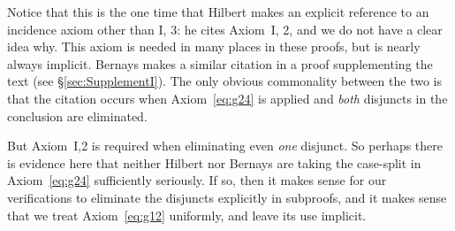 Notice that this is the one time that Hilbert makes an explicit reference to an incidence axiom other than I, 3: he cites Axiom~I, 2, and we do not have a clear idea why. This axiom is needed in many places in these proofs, but is nearly always implicit. Bernays makes a similar citation in a proof supplementing the text (see \S\ref{sec:SupplementI}). The only obvious commonality between the two is that the citation occurs when Axiom~\ref{eq:g24} is applied and \emph{both} disjuncts in the conclusion are eliminated. 

But Axiom~I,2 is required when eliminating even \emph{one} disjunct. So perhaps there is evidence here that neither Hilbert nor Bernays are taking the case-split in Axiom~\ref{eq:g24} sufficiently seriously. If so, then it makes sense for our verifications to eliminate the disjuncts explicitly in subproofs, and it makes sense that we treat Axiom~\ref{eq:g12} uniformly, and leave its use implicit.

